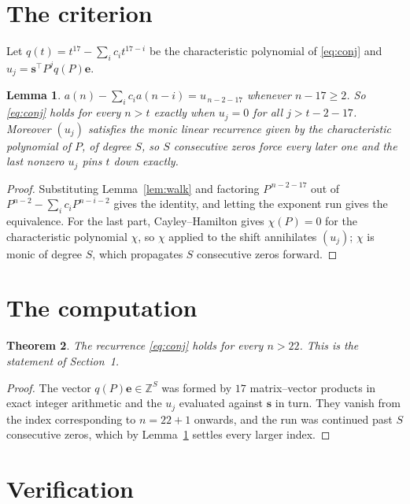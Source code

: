 \documentclass[11pt,a4paper]{article}
\theoremstyle{plain}
\newtheorem{theorem}{Theorem}
\newtheorem{lemma}[theorem]{Lemma}
\theoremstyle{definition}
\begin{document}
\section{The criterion}

Let $q(t)=t^{17}-\sum_i c_i t^{17-i}$ be the characteristic polynomial of
\eqref{eq:conj} and $u_j=\mathbf{s}^{\!\top}P^{j}q(P)\mathbf{e}$.

\begin{lemma}\label{lem:crit}
$a(n)-\sum_i c_i a(n-i)=u_{\,n-2-17}$ whenever $n-17\ge2$. So \eqref{eq:conj}
holds for every $n>t$ exactly when $u_j=0$ for all $j>t-2-17$. Moreover $(u_j)$
satisfies the monic linear recurrence given by the characteristic polynomial of $P$, of
degree $S$, so $S$ consecutive zeros force every later one and the last nonzero $u_j$ pins
$t$ down exactly.
\end{lemma}

\begin{proof}
Substituting Lemma~\ref{lem:walk} and factoring $P^{\,n-2-17}$ out of
$P^{n-2}-\sum_i c_i P^{n-i-2}$ gives the identity, and letting the exponent run gives the
equivalence. For the last part, Cayley--Hamilton gives $\chi(P)=0$ for the characteristic
polynomial $\chi$, so $\chi$ applied to the shift annihilates $(u_j)$; $\chi$ is monic of
degree $S$, which propagates $S$ consecutive zeros forward.
\end{proof}

\section{The computation}

\begin{theorem}
The recurrence \eqref{eq:conj} holds for every $n>22$. This is the statement of
Section~1.
\end{theorem}

\begin{proof}
The vector $q(P)\mathbf{e}\in\mathbb{Z}^{S}$ was formed by $17$ matrix--vector
products in exact integer arithmetic and the $u_j$ evaluated against $\mathbf{s}$ in turn.
They vanish from the index corresponding to $n=22+1$ onwards, and the run was continued
past $S$ consecutive zeros, which by Lemma~\ref{lem:crit} settles every larger index.
\end{proof}

\section{Verification}
\end{document}

